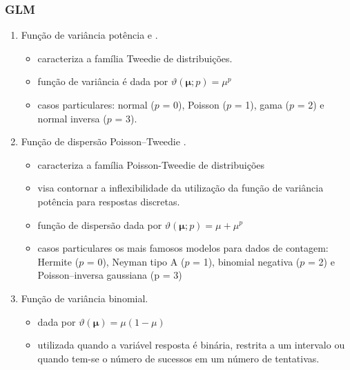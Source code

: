 \documentclass[10pt,
  aspectratio=169,
  serif,
  mathserif,
  professionalfont,
  compress,
  handout,
  ]{beamer}\usepackage[]{graphicx}\usepackage[]{color}
\begin{document}

\begin{frame}

  \frametitle{GLM}
  
  \begin{enumerate}
  \item Função de variância potência \cite{Jorgensen87} e \cite{Jorgensen97}. 
  
    \begin{itemize}
      \item caracteriza a família Tweedie de distribuições.
      \item função de variância é dada por $\vartheta\left(\boldsymbol{\mu}; p\right) = \mu^p$
      \item casos particulares: normal ($p$ = 0), Poisson ($p$ = 1), gama ($p$ = 2) e normal inversa ($p$ = 3).
    \end{itemize}

  
  \item Função de dispersão Poisson–Tweedie \cite{Jorgensen15}.
  
    \begin{itemize}
      \item caracteriza a família Poisson-Tweedie de distribuições
      \item visa contornar a inflexibilidade da utilização da função de variância potência para respostas discretas. 
      \item função de dispersão dada por $\vartheta\left(\boldsymbol{\mu}; p\right) = \mu + \mu^p$
      \item casos particulares os mais famosos modelos para dados de contagem: Hermite ($p$ = 0), Neyman tipo A ($p$ = 1), binomial negativa ($p$ = 2) e Poisson–inversa gaussiana (p = $3$)
      
    \end{itemize}

  \item Função de variância binomial. 
  
    \begin{itemize}
      \item dada por $\vartheta(\boldsymbol{\mu}) = \mu(1 - \mu)$
      \item utilizada quando a variável resposta é binária, restrita a um intervalo ou quando tem-se o número de sucessos em um número de tentativas.
    \end{itemize}

\end{enumerate}

\end{frame}
\end{document}
